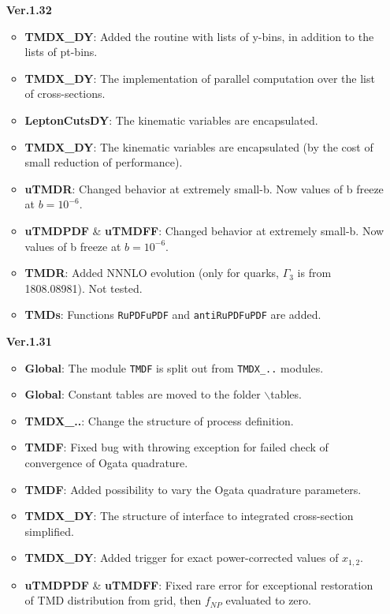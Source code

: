\documentclass[prd,nofootinbib,eqsecnum,final]{revtex4}
\renewcommand{\(}{\left(}
\renewcommand{\)}{\right)}
\renewcommand{\[}{\left[}
\renewcommand{\]}{\right]}
\begin{document}
\begin{itemize}
\item[\textbf{Ver.1.32}]
\begin{itemize}
\item \textbf{TMDX{\_}DY}: Added the routine with lists of y-bins, in addition to the lists of pt-bins.
\item \textbf{TMDX{\_}DY}: The implementation of parallel computation over the list of cross-sections.
\item \textbf{LeptonCutsDY}: The kinematic variables are encapsulated.
\item \textbf{TMDX{\_}DY}: The kinematic variables are encapsulated (by the cost of small reduction of performance).
\item \textbf{uTMDR}: Changed behavior at extremely small-b. Now values of b freeze at $b=10^{-6}$.
\item \textbf{uTMDPDF} \& \textbf{uTMDFF}: Changed behavior at extremely small-b. Now values of b freeze at $b=10^{-6}$.
\item \textbf{TMDR}: Added NNNLO evolution (only for quarks, $\Gamma_3$ is from 1808.08981). Not tested.
\item \textbf{TMDs}: Functions \texttt{RuPDFuPDF} and \texttt{antiRuPDFuPDF} are added.
\end{itemize}

\item[\textbf{Ver.1.31}]
\begin{itemize}
\item \textbf{Global}: The module \texttt{TMDF} is split out from \texttt{TMDX{\_}..} modules.
\item \textbf{Global}: Constant tables are moved to the folder $\backslash$tables.
\item \textbf{TMDX{\_}..}: Change the structure of process definition.
\item \textbf{TMDF}: Fixed bug with throwing exception for failed check of convergence of Ogata quadrature.
\item \textbf{TMDF}: Added possibility to vary the Ogata quadrature parameters.
\item \textbf{TMDX{\_}DY}: The structure of interface to integrated cross-section simplified.
\item \textbf{TMDX{\_}DY}: Added trigger for exact power-corrected values of $x_{1,2}$.
\item \textbf{uTMDPDF} \& \textbf{uTMDFF}: Fixed rare error for exceptional restoration of TMD distribution from grid, then $f_{NP}$ evaluated to zero.
\end{itemize}


\end{itemize}
\end{document}
